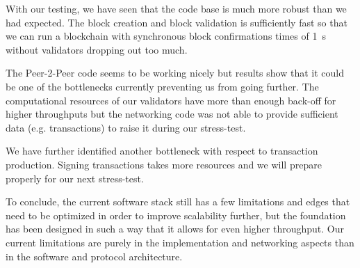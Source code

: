 With our testing, we have seen that the code base is much more robust
than we had expected. The block creation and block validation is
sufficiently fast so that we can run a blockchain with synchronous block
confirmations times of \SI{1}{s} without validators dropping out too
much.

The Peer-2-Peer code seems to be working nicely but results show that it
could be one of the bottlenecks currently preventing us from going
further. The computational resources of our validators have more than
enough back-off for higher throughputs but the networking code was not
able to provide sufficient data (e.g. transactions) to raise it during
our stress-test.

We have further identified another bottleneck with respect to transaction
production. Signing transactions takes more resources and we will
prepare properly for our next stress-test.

To conclude, the current software stack still has a few limitations and
edges that need to be optimized in order to improve scalability further,
but the foundation has been designed in such a way that it allows for
even higher throughput. Our current limitations are purely in the
implementation and networking aspects than in the software and protocol
architecture.
